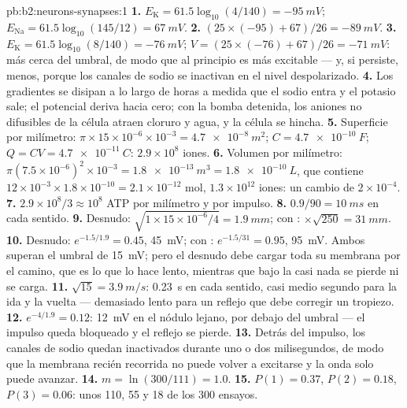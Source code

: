 \begin{solution}{pb:b2:neurons-synapses:1}
\textbf{1.} $E_{\mathrm K} = 61.5\log_{10}(4/140) = \qty{-95}{mV}$;
$E_{\mathrm{Na}} = 61.5\log_{10}(145/12) = \qty{+67}{mV}$.
\textbf{2.} $(25\times(-95) + 67)/26 = \qty{-89}{mV}$.
\textbf{3.} $E_{\mathrm K} = 61.5\log_{10}(8/140) = \qty{-76}{mV}$;
$V = (25\times(-76) + 67)/26 = \qty{-71}{mV}$: más cerca del umbral, de
modo que al principio es más excitable --- y, si persiste, menos, porque
los canales de sodio se inactivan en el nivel despolarizado.
\textbf{4.} Los gradientes se disipan a lo largo de horas a medida que el
sodio entra y el potasio sale; el potencial deriva hacia cero; con la
bomba detenida, los aniones no difusibles de la célula atraen cloruro y
agua, y la célula se hincha.
\textbf{5.} Superficie por milímetro: $\pi\times 15\times 10^{-6}\times
10^{-3} = \qty{4.7e-8}{m^2}$; $C = \qty{4.7e-10}{F}$; $Q = CV =
\qty{4.7e-11}{C}$: $2.9\times 10^{8}$ iones.
\textbf{6.} Volumen por milímetro: $\pi(7.5\times 10^{-6})^{2}\times
10^{-3} = \qty{1.8e-13}{m^3} = \qty{1.8e-10}{L}$, que contiene $12\times
10^{-3}\times 1.8\times 10^{-10} = 2.1\times 10^{-12}$ mol, $1.3\times
10^{12}$ iones: un cambio de $2\times 10^{-4}$.
\textbf{7.} $2.9\times 10^{8}/3 \approx 10^{8}$ ATP por milímetro y por
impulso.
\textbf{8.} $0.9/90 = \qty{10}{ms}$ en cada sentido.
\textbf{9.} Desnudo: $\sqrt{1\times 15\times 10^{-6}/4} = \qty{1.9}{mm}$;
con : $\times\sqrt{250} = \qty{31}{mm}$.
\textbf{10.} Desnudo: $e^{-1.5/1.9} = 0.45$, \qty{45}{mV}; con :
$e^{-1.5/31} = 0.95$, \qty{95}{mV}. Ambos superan el umbral de
\qty{15}{mV}; pero el  desnudo debe cargar toda su membrana por el
camino, que es lo que lo hace lento, mientras que bajo la  casi
nada se pierde ni se carga.
\textbf{11.} $\sqrt{15} = \qty{3.9}{m/s}$: \qty{0.23}{s} en cada sentido,
casi medio segundo para la ida y la vuelta --- demasiado lento para un
reflejo que debe corregir un tropiezo.
\textbf{12.} $e^{-4/1.9} = 0.12$: \qty{12}{mV} en el nódulo lejano, por
debajo del umbral --- el impulso queda bloqueado y el reflejo se pierde.
\textbf{13.} Detrás del impulso, los canales de sodio quedan inactivados
durante uno o dos milisegundos, de modo que la membrana recién recorrida no
puede volver a excitarse y la onda solo puede avanzar.
\textbf{14.} $m = \ln(300/111) = 1.0$.
\textbf{15.} $P(1) = 0.37$, $P(2) = 0.18$, $P(3) = 0.06$: unos 110, 55
y 18 de los 300 ensayos.

\end{solution}
